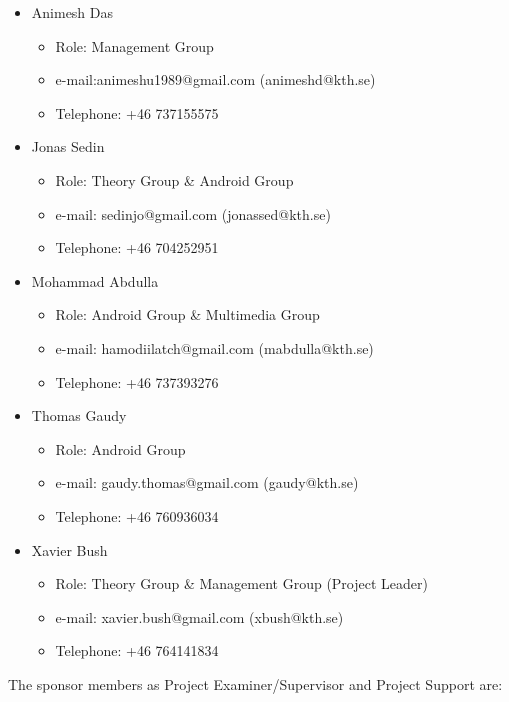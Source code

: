 \documentclass[11pt,a4paper,spanish]{book}  %
\theoremstyle{definition}  %
\theoremstyle{plain}  %
\theoremstyle{remark}  %
\begin{document}
\begin{itemize}

\item Animesh Das
	\begin{itemize}
	\item Role: Management Group
	\item e-mail:animeshu1989@gmail.com (animeshd@kth.se)
	\item Telephone: +46 737155575
	\end{itemize}
	
\item Jonas Sedin
	\begin{itemize}
	\item Role: Theory Group \& Android Group
	\item e-mail: sedinjo@gmail.com (jonassed@kth.se)
	\item Telephone: +46 704252951
	\end{itemize}
	
\item Mohammad Abdulla
	\begin{itemize}
	\item Role: Android Group \& Multimedia Group
	\item e-mail: hamodiilatch@gmail.com (mabdulla@kth.se)
	\item Telephone: +46 737393276
	\end{itemize}
	
\item Thomas Gaudy
	\begin{itemize}
	\item Role: Android Group
	\item e-mail: gaudy.thomas@gmail.com (gaudy@kth.se)
	\item Telephone: +46 760936034
	\end{itemize}
	
\item Xavier Bush
	\begin{itemize}
	\item Role: Theory Group \& Management Group (Project Leader)
	\item e-mail: xavier.bush@gmail.com (xbush@kth.se)
	\item Telephone: +46 764141834
	\end{itemize}
	
	
\end{itemize}

The sponsor members as Project Examiner/Supervisor and Project Support are:
\end{document}
